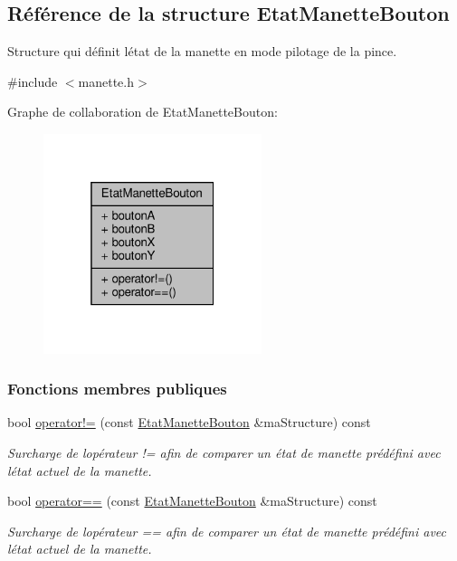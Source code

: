 \hypertarget{struct_etat_manette_bouton}{}\subsection{Référence de la structure Etat\+Manette\+Bouton}
\label{struct_etat_manette_bouton}


Structure qui définit l\textquotesingle{}état de la manette en mode pilotage de la pince.  




{\ttfamily \#include $<$manette.\+h$>$}



Graphe de collaboration de Etat\+Manette\+Bouton\+:\nopagebreak
\begin{figure}[H]
\begin{center}
\leavevmode
\includegraphics[width=181pt]{struct_etat_manette_bouton__coll__graph}
\end{center}
\end{figure}
\subsubsection*{Fonctions membres publiques}
\begin{DoxyCompactItemize}
\item 
bool \hyperlink{struct_etat_manette_bouton_a6ebd196e0fe68d30a8238b3e12194c93}{operator!=} (const \hyperlink{struct_etat_manette_bouton}{Etat\+Manette\+Bouton} \&ma\+Structure) const
\begin{DoxyCompactList}\small\item\em Surcharge de l\textquotesingle{}opérateur != afin de comparer un état de manette prédéfini avec l\textquotesingle{}état actuel de la manette. \end{DoxyCompactList}\item 
bool \hyperlink{struct_etat_manette_bouton_a7898661d3d19b6d8cf7005111d670ede}{operator==} (const \hyperlink{struct_etat_manette_bouton}{Etat\+Manette\+Bouton} \&ma\+Structure) const
\begin{DoxyCompactList}\small\item\em Surcharge de l\textquotesingle{}opérateur == afin de comparer un état de manette prédéfini avec l\textquotesingle{}état actuel de la manette. \end{DoxyCompactList}\end{DoxyCompactItemize}
